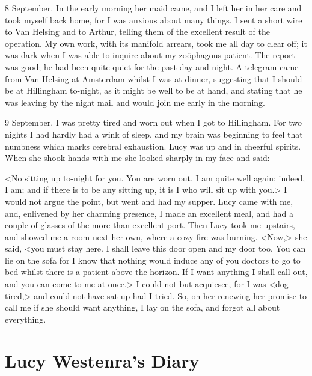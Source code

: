 \begin{diary}{8 September.}
In the early morning her maid came, and I left her in her care and took myself back home, for I was anxious about many things. I sent a short wire to Van Helsing and to Arthur, telling them of the excellent result of the operation. My own work, with its manifold arrears, took me all day to clear off; it was dark when I was able to inquire about my zoöphagous patient. The report was good; he had been quite quiet for the past day and night. A telegram came from Van Helsing at Amsterdam whilst I was at dinner, suggesting that I should be at Hillingham to-night, as it might be well to be at hand, and stating that he was leaving by the night mail and would join me early in the morning.
\end{diary}
 

\begin{diary}{9 September.}
I was pretty tired and worn out when I got to Hillingham. For two nights I had hardly had a wink of sleep, and my brain was beginning to feel that numbness which marks cerebral exhaustion. Lucy was up and in cheerful spirits. When she shook hands with me she looked sharply in my face and said:—

<No sitting up to-night for you. You are worn out. I am quite well again; indeed, I am; and if there is to be any sitting up, it is I who will sit up with you.> I would not argue the point, but went and had my supper. Lucy came with me, and, enlivened by her charming presence, I made an excellent meal, and had a couple of glasses of the more than excellent port. Then Lucy took me upstairs, and showed me a room next her own, where a cozy fire was burning. <Now,> she said, <you must stay here. I shall leave this door open and my door too. You can lie on the sofa for I know that nothing would induce any of you doctors to go to bed whilst there is a patient above the horizon. If I want anything I shall call out, and you can come to me at once.> I could not but acquiesce, for I was <dog-tired,> and could not have sat up had I tried. So, on her renewing her promise to call me if she should want anything, I lay on the sofa, and forgot all about everything.
\end{diary}


\section{Lucy Westenra's Diary}


